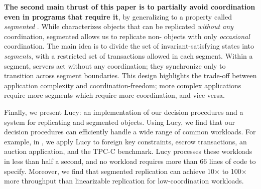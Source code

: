 
\textbf{The second main thrust of this paper is to partially avoid coordination
even in programs that require it}, by generalizing \invariantconfluence{} to a
property called \emph{segmented \invariantconfluence{}}. While
\invariantconfluence{} characterizes objects that can be replicated
\emph{without any} coordination, segmented \invariantconfluence{} allows us to
replicate non-\invariantconfluent{} objects with only \emph{occasional}
coordination. The main idea is to divide the set of invariant-satisfying states
into \emph{segments}, with a restricted set of transactions allowed in each
segment. Within a segment, servers act without any coordination; they
synchronize only to transition across segment boundaries. This design
highlights the trade-off between application complexity and
coordination-freedom; more complex applications require more segments which
require more coordination, and vice-versa.

Finally, we present Lucy: an implementation of our decision procedures and a
system for replicating \invariantconfluent{} and segmented
\invariantconfluent{} objects. Using Lucy, we find that our decision
procedures can efficiently handle a wide range of common workloads. For
example, in , we apply Lucy to foreign key constraints,
escrow transactions, an auction application, and the TPC-C benchmark. Lucy
processes these workloads in less than half a second, and no workload requires
more than 66 lines of code to specify. Moreover, we find that segmented
\invariantconfluent{} replication can achieve 10$\times$ to 100$\times$ more
throughput than linearizable replication for low-coordination workloads.

